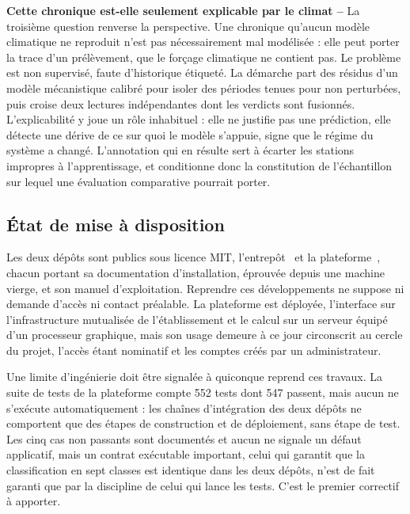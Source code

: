 \medskip
\noindent
\textbf{Cette chronique est-elle seulement explicable par le climat --} La troisième question renverse la perspective. Une chronique qu'aucun modèle climatique ne reproduit n'est pas nécessairement mal modélisée : elle peut porter la trace d'un prélèvement, que le forçage climatique ne contient pas. Le problème est non supervisé, faute d'historique étiqueté. La démarche part des résidus d'un modèle mécanistique calibré pour isoler des périodes tenues pour non perturbées, puis croise deux lectures indépendantes dont les verdicts sont fusionnés. L'explicabilité y joue un rôle inhabituel : elle ne justifie pas une prédiction, elle détecte une dérive de ce sur quoi le modèle s'appuie, signe que le régime du système a changé. L'annotation qui en résulte sert à écarter les stations impropres à l'apprentissage, et conditionne donc la constitution de l'échantillon sur lequel une évaluation comparative pourrait porter.

\subsection{État de mise à disposition}

Les deux dépôts sont publics sous licence MIT, l'entrepôt~\cite{depot_entrepot} et la plateforme~\cite{depot_plateforme}, chacun portant sa documentation d'installation, éprouvée depuis une machine vierge, et son manuel d'exploitation. Reprendre ces développements ne suppose ni demande d'accès ni contact préalable. La plateforme est déployée, l'interface sur l'infrastructure mutualisée de l'établissement et le calcul sur un serveur équipé d'un processeur graphique, mais son usage demeure à ce jour circonscrit au cercle du projet, l'accès étant nominatif et les comptes créés par un administrateur.

Une limite d'ingénierie doit être signalée à quiconque reprend ces travaux. La suite de tests de la plateforme compte \num{552} tests dont \num{547} passent, mais aucun ne s'exécute automatiquement : les chaînes d'intégration des deux dépôts ne comportent que des étapes de construction et de déploiement, sans étape de test. Les cinq cas non passants sont documentés et aucun ne signale un défaut applicatif, mais un contrat exécutable important, celui qui garantit que la classification en sept classes est identique dans les deux dépôts, n'est de fait garanti que par la discipline de celui qui lance les tests. C'est le premier correctif à apporter.
